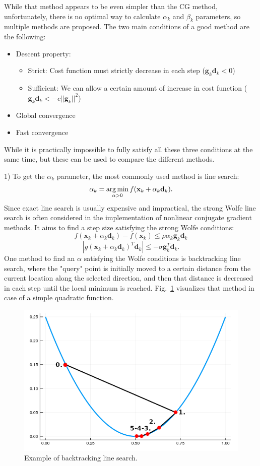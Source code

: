 While that method appears to be even simpler than the CG method, unfortunately, there is no optimal way to calculate $\alpha_k$ and $\beta_k$ parameters, so multiple methods are proposed. The two main conditions of a good method are the following:
\begin{itemize}
    \item Descent property:
    \begin{itemize}
        \item Strict: Cost function must strictly decrease in each step ($\mathbf{g}_k \mathbf{d}_k < 0$)
        \item Sufficient: We can allow a certain amount of increase in cost function ($\mathbf{g}_k \mathbf{d}_k < -c ||\mathbf{g}_k||^2$)
    \end{itemize}
    \item Global convergence
    \item Fast convergence
\end{itemize}
While it is practically impossible to fully satisfy all these three conditions at the same time, but these can be used to compare the different methods.

1) To get the $\alpha_k$ parameter, the most commonly used method is line search:
$$\alpha_k = \operatorname*{arg\,min}_{\alpha > 0} f(\mathbf{x}_k + \alpha_k \mathbf{d}_k).$$
Since exact line search is usually expensive and impractical, the strong Wolfe line search is often considered in the implementation of nonlinear conjugate gradient methods. It aims to find a step size satisfying the strong Wolfe conditions:
$$f(\mathbf{x}_k + \alpha_k \mathbf{d}_k) - f(\mathbf{x}_k) \leq \rho \alpha_k \mathbf{g}_k \mathbf{d}_k$$
$$|g(\mathbf{x}_k + \alpha_k \mathbf{d}_k)^T \mathbf{d}_k| \leq - \sigma \mathbf{g}_k^T \mathbf{d}_k.$$
One method to find an $\alpha$ satisfying the Wolfe conditions is backtracking line search, where the "query" point is initially moved to a certain distance from the current location along the selected direction, and then that distance is decreased in each step until the local minimum is reached.
Fig.~\ref{fig:backtracking} visualizes that method in case of a simple quadratic function.

\begin{figure}
    \centering
    \includegraphics[width=0.3\linewidth]{images/project with Wiem/backtracking.png}
    \caption{Example of backtracking line search.}
    \label{fig:backtracking}
\end{figure}

